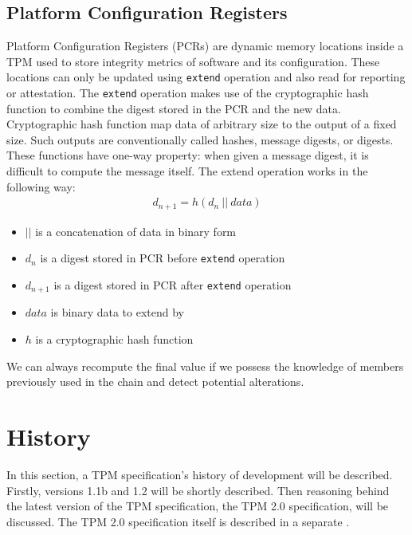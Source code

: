 \subsection{Platform Configuration Registers}
Platform Configuration Registers (PCRs) are dynamic memory locations inside a TPM used to store integrity metrics of software and its configuration. These locations can only be updated using \texttt{extend} operation and also read for reporting or attestation. The \texttt{extend} operation makes use of the cryptographic hash function to combine the digest stored in the PCR and the new data. Cryptographic hash function map data of arbitrary size to the output of a fixed size. Such outputs are conventionally called hashes, message digests, or digests. These functions have one-way property: when given a message digest, it is difficult  to compute the message itself. The extend operation works in the following way:
\begin{align*}
    d_{n+1} = h(d_{n}\ ||\ data)
\end{align*}
\begin{itemize}
    \item $||$ is a concatenation of data in binary form
    \item $ d_{n} $ is a digest stored in PCR before \texttt{extend} operation
    \item $ d_{n+1} $ is a digest stored in PCR after \texttt{extend} operation
    \item $ data $ is binary data to extend by
    \item $ h $ is a cryptographic hash function
\end{itemize}

We can always recompute the final value if we possess the knowledge of members previously used in the chain and detect potential alterations.

\section{History}
In this section, a TPM specification's history of development will be described. Firstly, versions 1.1b and 1.2 will be shortly described. Then reasoning behind the latest version of the TPM specification, the TPM 2.0 specification, will be discussed. The TPM 2.0 specification itself is described in a separate .

